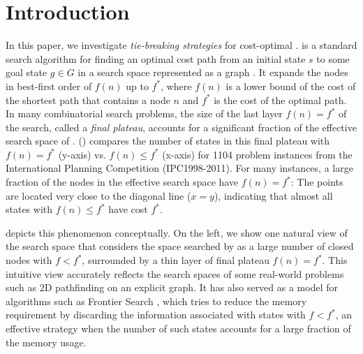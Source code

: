 
\section{Introduction}
\label{sec:introduction}

In this paper, we investigate \emph{tie-breaking strategies} for cost-optimal \astar.
\astar is a standard search algorithm for finding an optimal cost path from an initial state $s$ to some goal
state $g \in G$ in a search space represented as a graph \cite{hart1968formal}.
It expands the nodes in best-first order of $f(n)$ up to $f^*$,
where $f(n)$ is a lower bound of the cost of the shortest path that contains a node $n$ and $f^*$ is the cost of the optimal path.
% 
In many combinatorial search problems, the size of the last layer $f(n)=f^*$ of the search, called a \emph{final plateau},
accounts for a significant fraction of the effective search space of \astar.  
() compares the number of states in this final plateau with $f(n) = f^*$ (y-axis)
vs. $f(n) \leq f^*$ (x-axis) for 1104 problem instances from the International Planning Competition (IPC1998-2011).
For many instances, a large fraction of the nodes in the effective search space have $f(n)=f^*$: The points
are located very close to the diagonal line ($x=y$), indicating that almost all states with $f(n) \leq f^*$ have cost
$f^*$.

 depicts this phenomenon conceptually.
% 
On the left, we show 
one natural  %
view of the search space that considers the space searched by \astar as
a large number of closed nodes with $f<f^*$, surrounded by
a thin layer of final plateau $f(n)=f^*$.  This intuitive view
accurately reflects the search spaces of some real-world problems such as 2D pathfinding on an explicit
graph.
% 
It has also served as a model for algorithms such as Frontier Search \cite{korf1999divide,korf2000divide},
which tries to reduce the memory requirement by discarding the information associated with states with $f<f^*$, an effective strategy when the number of such states accounts for a large fraction of the memory usage.
 
